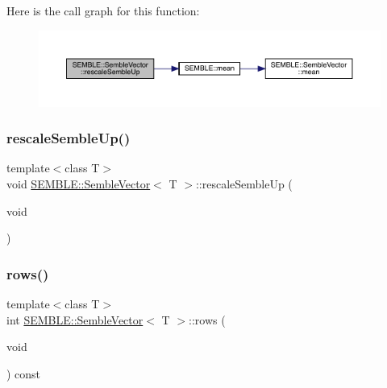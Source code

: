 Here is the call graph for this function\+:
\nopagebreak
\begin{figure}[H]
\begin{center}
\leavevmode
\includegraphics[width=350pt]{d9/d94/structSEMBLE_1_1SembleVector_aa9fbae5c5028eb49709043362099cb03_cgraph}
\end{center}
\end{figure}
\mbox{\label{structSEMBLE_1_1SembleVector_aa9fbae5c5028eb49709043362099cb03}} 
\subsubsection{\texorpdfstring{rescaleSembleUp()}{rescaleSembleUp()}\hspace{0.1cm}{\footnotesize\ttfamily [2/2]}}
{\footnotesize\ttfamily template$<$class T$>$ \\
void \mbox{\hyperlink{structSEMBLE_1_1SembleVector}{S\+E\+M\+B\+L\+E\+::\+Semble\+Vector}}$<$ T $>$\+::rescale\+Semble\+Up (\begin{DoxyParamCaption}\item[{void}]{ }\end{DoxyParamCaption})}

\mbox{\label{structSEMBLE_1_1SembleVector_a2d225b0e49bb4b0c1c9fd3f9202a48e5}} 
\subsubsection{\texorpdfstring{rows()}{rows()}\hspace{0.1cm}{\footnotesize\ttfamily [1/4]}}
{\footnotesize\ttfamily template$<$class T$>$ \\
int \mbox{\hyperlink{structSEMBLE_1_1SembleVector}{S\+E\+M\+B\+L\+E\+::\+Semble\+Vector}}$<$ T $>$\+::rows (\begin{DoxyParamCaption}\item[{void}]{ }\end{DoxyParamCaption}) const\hspace{0.3cm}{\ttfamily [inline]}}

